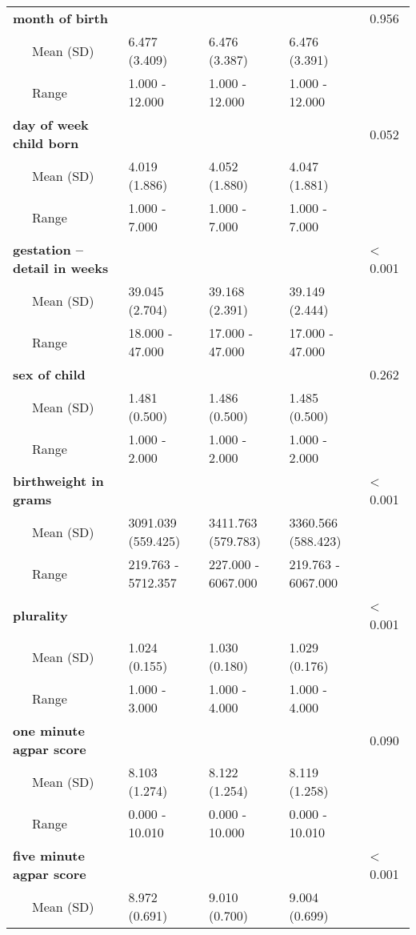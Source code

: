 \begin{longtable}[c]{@{}lllll@{}}
\\\addlinespace
\textbf{month of birth} & & & & 0.956
\\\addlinespace
~~~Mean (SD) & 6.477 (3.409) & 6.476 (3.387) & 6.476 (3.391) &
\\\addlinespace
~~~Range & 1.000 - 12.000 & 1.000 - 12.000 & 1.000 - 12.000 &
\\\addlinespace
\textbf{day of week child born} & & & & 0.052
\\\addlinespace
~~~Mean (SD) & 4.019 (1.886) & 4.052 (1.880) & 4.047 (1.881) &
\\\addlinespace
~~~Range & 1.000 - 7.000 & 1.000 - 7.000 & 1.000 - 7.000 &
\\\addlinespace
\textbf{gestation -- detail in weeks} & & & & \textless{} 0.001
\\\addlinespace
~~~Mean (SD) & 39.045 (2.704) & 39.168 (2.391) & 39.149 (2.444) &
\\\addlinespace
~~~Range & 18.000 - 47.000 & 17.000 - 47.000 & 17.000 - 47.000 &
\\\addlinespace
\textbf{sex of child} & & & & 0.262
\\\addlinespace
~~~Mean (SD) & 1.481 (0.500) & 1.486 (0.500) & 1.485 (0.500) &
\\\addlinespace
~~~Range & 1.000 - 2.000 & 1.000 - 2.000 & 1.000 - 2.000 &
\\\addlinespace
\textbf{birthweight in grams} & & & & \textless{} 0.001
\\\addlinespace
~~~Mean (SD) & 3091.039 (559.425) & 3411.763 (579.783) & 3360.566
(588.423) &
\\\addlinespace
~~~Range & 219.763 - 5712.357 & 227.000 - 6067.000 & 219.763 - 6067.000
&
\\\addlinespace
\textbf{plurality} & & & & \textless{} 0.001
\\\addlinespace
~~~Mean (SD) & 1.024 (0.155) & 1.030 (0.180) & 1.029 (0.176) &
\\\addlinespace
~~~Range & 1.000 - 3.000 & 1.000 - 4.000 & 1.000 - 4.000 &
\\\addlinespace
\textbf{one minute agpar score} & & & & 0.090
\\\addlinespace
~~~Mean (SD) & 8.103 (1.274) & 8.122 (1.254) & 8.119 (1.258) &
\\\addlinespace
~~~Range & 0.000 - 10.010 & 0.000 - 10.000 & 0.000 - 10.010 &
\\\addlinespace
\textbf{five minute agpar score} & & & & \textless{} 0.001
\\\addlinespace
~~~Mean (SD) & 8.972 (0.691) & 9.010 (0.700) & 9.004 (0.699) &

\end{longtable}
